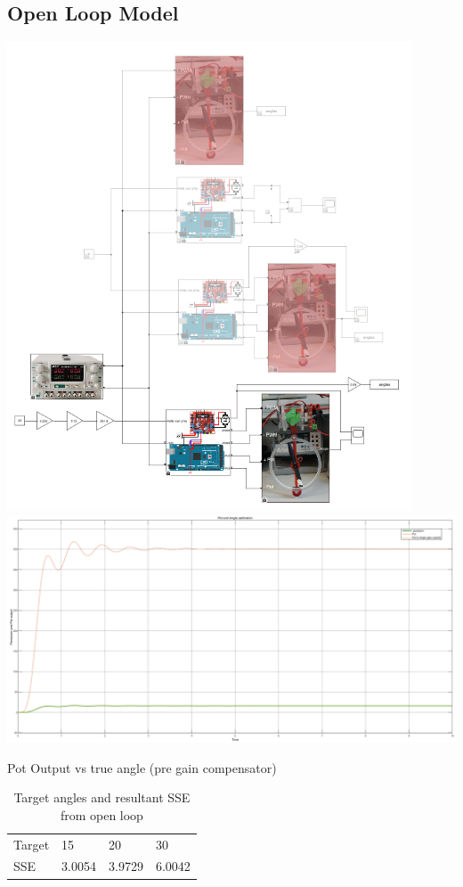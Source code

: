 \documentclass[a4paper,11pt]{article}
\begin{document}
\subsection*{Open Loop Model}

\includegraphics[width=0.9\textwidth]{inc/Lab4_sim.png}
\newpage
\includegraphics[width=\textwidth]{inc/pot_to_angle.png}
\begin{center}
        Pot Output vs true angle (pre gain compensator)
\end{center}
\begin{table}[h]
        \centering
        \begin{tabular}{|l|l|l|l|}
                Target & 15     & 20     & 30     \\
                SSE    & 3.0054 & 3.9729 & 6.0042
        \end{tabular}
        \caption{Target angles and resultant SSE from open loop}
\end{table}
\end{document}
